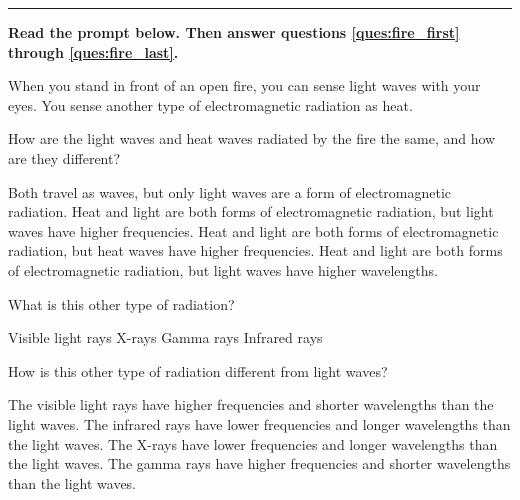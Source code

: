 \documentclass{exam}
\begin{document}
\begin{questions}

\vspace{1em}
\hrule 

\clearpage
\begin{EnvUplevel}
\textbf{Read the prompt below. Then answer questions \ref{ques:fire_first} through \ref{ques:fire_last}.}

When you stand in front of an open fire, you can sense light waves with your eyes. You sense another type of electromagnetic radiation as heat.
\end{EnvUplevel}


\question \label{ques:fire_first} %
How are the light waves and heat waves radiated by the fire the same, and how are they different?

\begin{choices}
\choice Both travel as waves, but only light waves are a form of electromagnetic radiation.
\CorrectChoice Heat and light are both forms of electromagnetic radiation, but light waves have higher frequencies.
\choice Heat and light are both forms of electromagnetic radiation, but heat waves have higher frequencies.
\choice Heat and light are both forms of electromagnetic radiation, but light waves have higher wavelengths.
\end{choices}


\question %
What is this other type of radiation?

\begin{choices}
\choice Visible light rays
\choice X-rays
\choice Gamma rays
\CorrectChoice Infrared rays
\end{choices}


\question \label{ques:fire_last} %
How is this other type of radiation different from light waves?

\begin{choices}
\choice The visible light rays have higher frequencies and shorter wavelengths than the light waves.
\CorrectChoice The infrared rays have lower frequencies and longer wavelengths than the light waves.
\choice The X-rays have lower frequencies and longer wavelengths than the light waves.
\choice The gamma rays have higher frequencies and shorter wavelengths than the light waves.
\end{choices}
\vspace{1em}


\end{questions}
\end{document}

